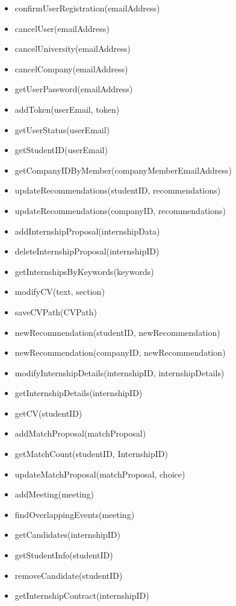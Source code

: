 \begin{itemize}
\begin{itemize}
        \item confirmUserRegistration(emailAddress)
        \item cancelUser(emailAddress)
        \item cancelUniversity(emailAddress)
        \item cancelCompany(emailAddress)
        \item getUserPassword(emailAddress)
        \item addToken(userEmail, token)
        \item getUserStatus(userEmail)
        \item getStudentID(userEmail)
        \item getCompanyIDByMember(companyMemberEmailAddress)
        \item updateRecommendations(studentID, recommendations)
        \item updateRecommendations(companyID, recommendations)
        \item addInternshipProposal(internshipData)
        \item deleteInternshipProposal(internshipID)
        \item getInternshipsByKeywords(keywords)
        \item modifyCV(text, section)
        \item saveCVPath(CVPath)
        \item newRecommendation(studentID, newRecommendation)
        \item newRecommendation(companyID, newRecommendation)
        \item modifyInternshipDetails(internshipID, internshipDetails)
        \item getInternshipDetails(internshipID)
        \item getCV(studentID)
        \item addMatchProposal(matchProposal)
        \item getMatchCount(studentID, InternshipID)
        \item updateMatchProposal(matchProposal, choice)
        \item addMeeting(meeting)
        \item findOverlappingEvents(meeting)
        \item getCandidates(internshipID)
        \item getStudentInfo(studentID)
        \item removeCandidate(studentID)
        \item getInternshipContract(internshipID)

\end{itemize}
\end{itemize}
